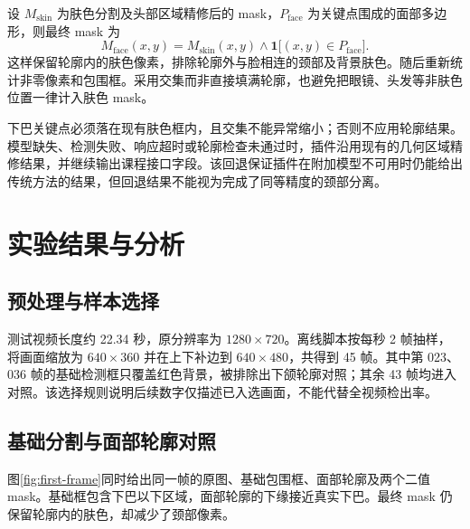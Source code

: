 \documentclass[UTF8,a4paper,12pt,fontset=windows]{ctexart}
\begin{document}
设 \(M_{\mathrm{skin}}\) 为肤色分割及头部区域精修后的 mask，\(P_{\mathrm{face}}\) 为关键点围成的面部多边形，则最终 mask 为
\begin{equation}
  M_{\mathrm{face}}(x,y)=M_{\mathrm{skin}}(x,y)\land
  \mathbf{1}\bigl[(x,y)\in P_{\mathrm{face}}\bigr].
\end{equation}
这样保留轮廓内的肤色像素，排除轮廓外与脸相连的颈部及背景肤色。随后重新统计非零像素和包围框。采用交集而非直接填满轮廓，也避免把眼镜、头发等非肤色位置一律计入肤色 mask。

下巴关键点必须落在现有肤色框内，且交集不能异常缩小；否则不应用轮廓结果。模型缺失、检测失败、响应超时或轮廓检查未通过时，插件沿用现有的几何区域精修结果，并继续输出课程接口字段。该回退保证插件在附加模型不可用时仍能给出传统方法的结果，但回退结果不能视为完成了同等精度的颈部分离。

\section{实验结果与分析}
\subsection{预处理与样本选择}
测试视频长度约 22.34 秒，原分辨率为 \(1280\times720\)。离线脚本按每秒 2 帧抽样，将画面缩放为 \(640\times360\) 并在上下补边到 \(640\times480\)，共得到 45 帧。其中第 023、036 帧的基础检测框只覆盖红色背景，被排除出下颌轮廓对照；其余 43 帧均进入对照。该选择规则说明后续数字仅描述已入选画面，不能代替全视频检出率。

\subsection{基础分割与面部轮廓对照}
图\ref{fig:first-frame}同时给出同一帧的原图、基础包围框、面部轮廓及两个二值 mask。基础框包含下巴以下区域，面部轮廓的下缘接近真实下巴。最终 mask 仍保留轮廓内的肤色，却减少了颈部像素。
\end{document}
